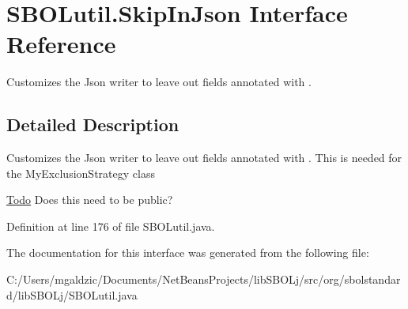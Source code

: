 \hypertarget{interfaceorg_1_1sbolstandard_1_1lib_s_b_o_lj_1_1_s_b_o_lutil_1_1_skip_in_json}{
\section{SBOLutil.SkipInJson Interface Reference}
\label{interfaceorg_1_1sbolstandard_1_1lib_s_b_o_lj_1_1_s_b_o_lutil_1_1_skip_in_json}
}


Customizes the Json writer to leave out fields annotated with .  




\subsection{Detailed Description}
Customizes the Json writer to leave out fields annotated with . This is needed for the MyExclusionStrategy class \begin{Desc}
\item[\hyperlink{todo__todo000006}{Todo}]Does this need to be public?\end{Desc}


Definition at line 176 of file SBOLutil.java.



The documentation for this interface was generated from the following file:\begin{DoxyCompactItemize}
\item 
C:/Users/mgaldzic/Documents/NetBeansProjects/libSBOLj/src/org/sbolstandard/libSBOLj/SBOLutil.java\end{DoxyCompactItemize}
